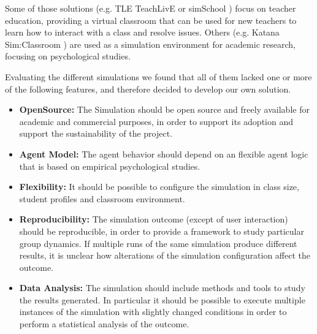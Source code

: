 \bb

Some of those solutions (e.g. TLE TeachLivE\cite{Dieker2014}\cite{Dieker2017} or
simSchool \cite{Badiee2015}) focus on teacher education, providing a virtual classroom
that can be used for new teachers to learn how to interact with a class and resolve issues.
Others (e.g. Katana Sim:Classroom \cite{Blume2019}) are used as a simulation
environment for academic research, focusing on psychological studies.

\bb

Evaluating the different simulations we found that all of them lacked one or more
of the following features, and therefore decided to develop our own solution.

\begin{itemize}
    \item \textbf{OpenSource:} The Simulation should be open source and freely available
    for academic and commercial purposes, in order to support its adoption and support
    the sustainability of the project.
    \item \textbf{Agent Model:} The agent behavior should depend on an
    flexible agent logic that is based on empirical psychological studies.
    \item \textbf{Flexibility:} It should be possible to configure the simulation in
    class size, student profiles and classroom environment.
    \item \textbf{Reproducibility:} The simulation outcome (except of user interaction) should
    be reproducible, in order to provide a framework to study particular group dynamics.
    If multiple runs of the same simulation produce different results, it is unclear
    how alterations of the simulation configuration affect the outcome.
    \item \textbf{Data Analysis:} The simulation should include methods and tools
    to study the results generated. In particular it should be possible to execute multiple
    instances of the simulation with slightly changed conditions in order to
    perform a statistical analysis of the outcome.
\end{itemize}
